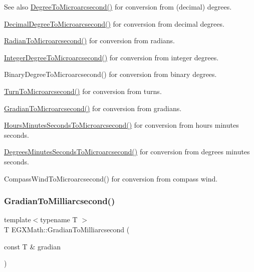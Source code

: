 \begin{DoxySeeAlso}{See also}
\mbox{\hyperlink{group___e_g_x_math-_angle_conversions-_degree_ga31b65388fe1b4656663b3d66b9d764e6}{Degree\+To\+Microarcsecond()}} for conversion from (decimal) degrees. 

\mbox{\hyperlink{group___e_g_x_math-_angle_conversions-_decimal_degree_ga6fa88456069907fd24716fa575517571}{Decimal\+Degree\+To\+Microarcsecond()}} for conversion from decimal degrees. 

\mbox{\hyperlink{group___e_g_x_math-_angle_conversions-_radian_ga3a515ca2838a305fa40750763f546a86}{Radian\+To\+Microarcsecond()}} for conversion from radians. 

\mbox{\hyperlink{group___e_g_x_math-_angle_conversions-_integer_degree_ga69179d6082764595c7014805e1f6b31e}{Integer\+Degree\+To\+Microarcsecond()}} for conversion from integer degrees. 

Binary\+Degree\+To\+Microarcsecond() for conversion from binary degrees. 

\mbox{\hyperlink{group___e_g_x_math-_angle_conversions-_turn_ga41a861a04d65aab05647b32142e6d80d}{Turn\+To\+Microarcsecond()}} for conversion from turns. 

\mbox{\hyperlink{group___e_g_x_math-_angle_conversions-_gradian_gab7781c860ea3ab9c9cf76ab639846a07}{Gradian\+To\+Microarcsecond()}} for conversion from gradians. 

\mbox{\hyperlink{group___e_g_x_math-_angle_conversions-_hours_minutes_seconds_ga061e4fa10d73e459d5f411cfe436bbe3}{Hours\+Minutes\+Seconds\+To\+Microarcsecond()}} for conversion from hours minutes seconds. 

\mbox{\hyperlink{group___e_g_x_math-_angle_conversions-_degrees_minutes_seconds_gabc4de7934e776de13953707344a4da88}{Degrees\+Minutes\+Seconds\+To\+Microarcsecond()}} for conversion from degrees minutes seconds. 

Compass\+Wind\+To\+Microarcsecond() for conversion from compass wind. 
\end{DoxySeeAlso}
\mbox{\label{group___e_g_x_math-_angle_conversions-_gradian_gad77ea0956413029f4166dce8d7f5ce83}} 
\subsubsection{\texorpdfstring{Gradian\+To\+Milliarcsecond()}{GradianToMilliarcsecond()}}
{\footnotesize\ttfamily template$<$typename T $>$ \\
T E\+G\+X\+Math\+::\+Gradian\+To\+Milliarcsecond (\begin{DoxyParamCaption}\item[{const T \&}]{gradian }\end{DoxyParamCaption})}



